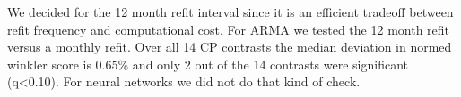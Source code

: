 %
We decided for the 12 month refit interval since it is an efficient tradeoff between refit frequency and computational cost. For ARMA we tested the 12 month refit versus a monthly refit. Over all 14 CP contrasts the median deviation in normed winkler score is $0.65\%$ and only 2 out of the 14 contrasts were significant (q<0.10). For neural networks we did not do that kind of check.
